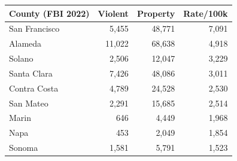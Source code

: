 \begin{tabular}{lrrr}
\toprule
County (FBI 2022) & Violent & Property & Rate/100k \\
\midrule
San Francisco & 5,455 & 48,771 & 7,091 \\
Alameda & 11,022 & 68,638 & 4,918 \\
Solano & 2,506 & 12,047 & 3,229 \\
Santa Clara & 7,426 & 48,086 & 3,011 \\
Contra Costa & 4,789 & 24,528 & 2,530 \\
San Mateo & 2,291 & 15,685 & 2,514 \\
Marin & 646 & 4,449 & 1,968 \\
Napa & 453 & 2,049 & 1,854 \\
Sonoma & 1,581 & 5,791 & 1,523 \\
\bottomrule
\end{tabular}
